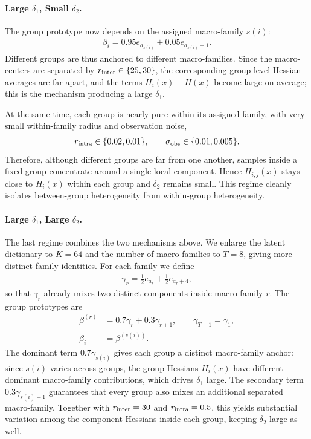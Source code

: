 \documentclass{article}
\theoremstyle{plain}
\begin{document}
\paragraph{Large $\delta_1$, Small $\delta_2$.}
The group prototype now depends on the assigned macro-family $s(i)$:
\begin{align*}
    \beta_i
    =
    0.95e_{a_{s(i)}}+0.05e_{a_{s(i)}+1}.
\end{align*}
Different groups are thus anchored to different macro-families. Since the macro-centers are separated by $r_{\rm inter}\in\{25,30\}$, the corresponding group-level Hessian averages are far apart, and the terms $H_i(x)-H(x)$ become large on average; this is the mechanism producing a large $\delta_1$.

At the same time, each group is nearly pure within its assigned family, with very small within-family radius and observation noise,
\begin{align*}
    r_{\rm intra}\in\{0.02,0.01\},
    \qquad
    \sigma_{\rm obs}\in\{0.01,0.005\}.
\end{align*}
Therefore, although different groups are far from one another, samples inside a fixed group concentrate around a single local component. Hence $H_{i,j}(x)$ stays close to $H_i(x)$ within each group and $\delta_2$ remains small. This regime cleanly isolates between-group heterogeneity from within-group heterogeneity.

\paragraph{Large $\delta_1$, Large $\delta_2$.}
The last regime combines the two mechanisms above. We enlarge the latent dictionary to $K=64$ and the number of macro-families to $T=8$, giving more distinct family identities. For each family we define
\begin{align*}
    \gamma_r
    =
    \frac12 e_{a_r}+\frac12 e_{a_r+4},
\end{align*}
so that $\gamma_r$ already mixes two distinct components inside macro-family $r$. The group prototypes are
\begin{align*}
    \beta^{(r)}
    &=
    0.7\gamma_r + 0.3\gamma_{r+1},
    \qquad \gamma_{T+1}=\gamma_1,\\
    \beta_i
    &=
    \beta^{(s(i))}.
\end{align*}
The dominant term $0.7\gamma_{s(i)}$ gives each group a distinct macro-family anchor: since $s(i)$ varies across groups, the group Hessians $H_i(x)$ have different dominant macro-family contributions, which drives $\delta_1$ large. The secondary term $0.3\gamma_{s(i)+1}$ guarantees that every group also mixes an additional separated macro-family. Together with $r_{\rm inter}=30$ and $r_{\rm intra}=0.5$, this yields substantial variation among the component Hessians inside each group, keeping $\delta_2$ large as well.
\end{document}
